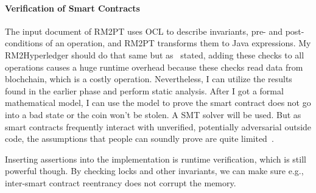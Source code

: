 \paragraph*{Verification of Smart Contracts}
The input document of RM2PT uses OCL to describe invariants, pre- and post-conditions of an operation, and RM2PT transforms them to Java expressions.
My RM2Hyperledger should do that same but as~\cite{li2020securing} stated, adding these checks to all operations causes a huge runtime overhead because these checks read data from blochchain, which is a costly operation.
Nevertheless, I can utilize the results found in the earlier phase and perform static analysis.
After I got a formal mathematical model, I can use the model to prove the smart contract does not go into a bad state or the coin won't be stolen.
A SMT solver will be used.
But as smart contracts frequently interact with unverified, potentially adversarial outside code,
the assumptions that people can soundly prove are quite limited~\cite{bram2021rich}.

Inserting assertions into the implementation is runtime verification, which is still powerful though.
By checking locks and other invariants, we can make sure e.g., inter-smart contract reentrancy does not corrupt the memory.


%
%
%
%

